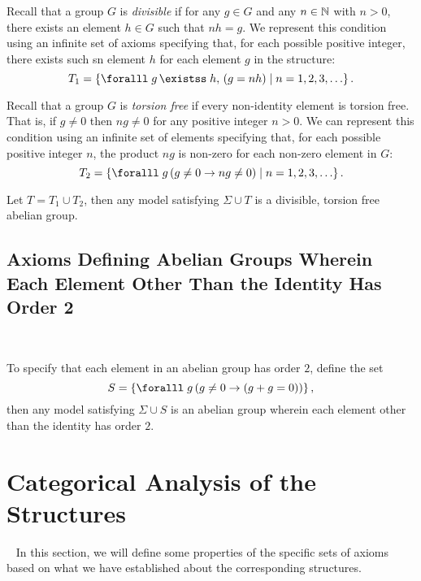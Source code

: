 \begin{enumarabic}
  \item Recall that a group $G$ is \emph{divisible} if for any $g \in G$
    and any $n \in \mathbb{N}$ with $n > 0$, there exists an element $h \in G$
    such that $n h = g$.
    We represent this condition using an infinite set of axioms
    specifying that, for each possible positive integer,
    there exists such sn element $h$ for each element $g$ in the structure:
    \[ T_1 = \set{ \forall g\, \exists h,\, (g = nh) \mid n = 1, 2, 3, \ldots }. \]
    
  \item Recall that a group $G$ is \emph{torsion free} if every non-identity element
    is torsion free. That is, if $g \neq 0$ then $ng \neq 0$ for any positive
    integer $n > 0$.
    We can represent this condition using an infinite set of elements
    specifying that, for each possible positive integer $n$,
    the product $ng$ is non-zero for each non-zero element in $G$:
    \[ T_2 = \set{ \forall g\, (g \neq 0 \lto ng \neq 0) \mid n = 1, 2, 3, \ldots }. \]
    
\end{enumarabic}

Let $T = T_1 \cup T_2$, then any model satisfying $\Sigma \cup T$
is a divisible, torsion free abelian group.



\subsection{Axioms Defining Abelian Groups Wherein Each Element Other Than the Identity
Has Order 2}~\label{sec:axioms-order-two-elements}

To specify that each element in an abelian group has order $2$,
define the set
\[ S = \set{\forall g\, ( g \neq 0 \lto (g + g = 0) ) }, \]
then any model satisfying $\Sigma \cup S$ is an abelian group
wherein each element other than the identity has order $2$.


\section{Categorical Analysis of the Structures}~\label{sec:categorical-analysis}
In this section, we will define some properties of the specific sets of axioms
based on what we have established about the corresponding structures.

